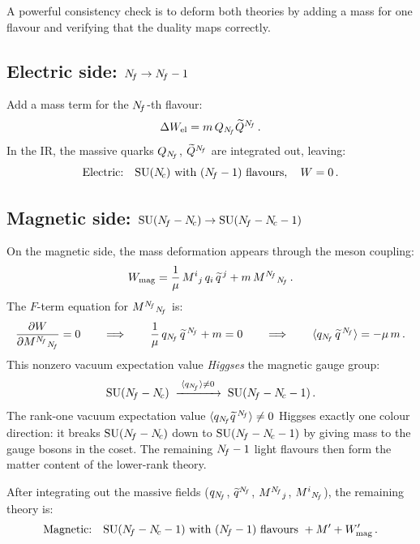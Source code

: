 \documentclass[11pt,a4paper]{article}
\begin{document}
A powerful consistency check is to deform both theories by adding a mass for
one flavour and verifying that the duality maps correctly.

\subsection{Electric side: $N_{\!f} \to N_{\!f} - 1$}

Add a mass term for the $N_{\!f}$-th flavour:
\begin{equation}\label{eq:mass-el}
  \Delta W_{\text{el}} = m\, Q_{N_{\!f}} \widetilde{Q}^{N_{\!f}}\,.
\end{equation}
In the IR, the massive quarks $Q_{N_{\!f}}$, $\widetilde{Q}^{N_{\!f}}$ are integrated
out, leaving:
\begin{equation}\label{eq:electric-deformed}
  \text{Electric:}\quad \mathrm{SU}(N_{\!c}) \text{ with } (N_{\!f} - 1)
  \text{ flavours}, \quad W = 0\,.
\end{equation}

\subsection{Magnetic side: $\mathrm{SU}(N_{\!f} - N_{\!c}) \to \mathrm{SU}(N_{\!f} - N_{\!c} - 1)$}

On the magnetic side, the mass deformation appears through the meson coupling:
\begin{equation}\label{eq:mass-mag}
  W_{\text{mag}} = \frac{1}{\mu}\, M^i{}_j\, q_i\, \widetilde{q}^{\,j}
  + m\, M^{N_{\!f}}{}_{N_{\!f}}\,.
\end{equation}
The $F$-term equation for $M^{N_{\!f}}{}_{N_{\!f}}$ is:
\[
  \frac{\partial W}{\partial M^{N_{\!f}}{}_{N_{\!f}}} = 0
  \qquad\Longrightarrow\qquad
  \frac{1}{\mu}\, q_{N_{\!f}}\, \widetilde{q}^{\,N_{\!f}} + m = 0
  \qquad\Longrightarrow\qquad
  \langle q_{N_{\!f}}\, \widetilde{q}^{\,N_{\!f}} \rangle = -\mu\, m\,.
\]
This nonzero vacuum expectation value \emph{Higgses} the magnetic gauge group:
\[
  \mathrm{SU}(N_{\!f} - N_{\!c}) \;\xrightarrow{\;\langle q_{N_{\!f}} \rangle \neq 0\;}
  \;\mathrm{SU}(N_{\!f} - N_{\!c} - 1)\,.
\]
The rank-one vacuum expectation value
$\langle q_{N_{\!f}} \widetilde{q}^{\,N_{\!f}} \rangle \neq 0$ Higgses exactly
one colour direction: it breaks $\mathrm{SU}(N_{\!f} - N_{\!c})$ down to
$\mathrm{SU}(N_{\!f} - N_{\!c} - 1)$ by giving mass to the gauge bosons in the coset.
The remaining $N_{\!f} - 1$ light flavours then form the matter content of
the lower-rank theory.

After integrating out the massive fields ($q_{N_{\!f}}$, $\widetilde{q}^{N_{\!f}}$,
$M^{N_{\!f}}{}_j$, $M^i{}_{N_{\!f}}$), the remaining theory is:
\begin{equation}\label{eq:magnetic-deformed}
  \text{Magnetic:}\quad \mathrm{SU}(N_{\!f} - N_{\!c} - 1) \text{ with } (N_{\!f} - 1)
  \text{ flavours } + M' + W_{\text{mag}}'\,.
\end{equation}
\end{document}
